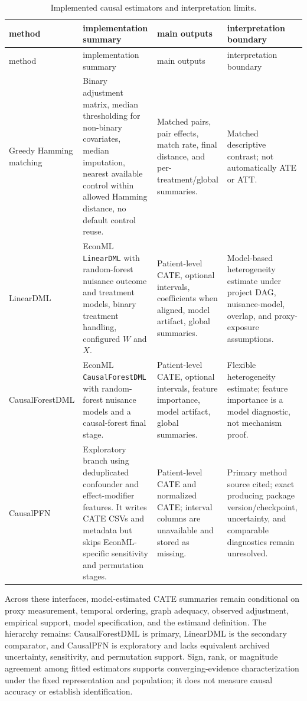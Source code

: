 \begin{longtable}{@{}L{0.18\textwidth}L{0.24\textwidth}L{0.24\textwidth}L{0.24\textwidth}@{}}
\caption[Implemented causal estimators and interpretation limits.]{Implemented causal estimators and interpretation limits.}
\label{tab:causal-estimator-methods}\\
\toprule
method & implementation summary & main outputs & interpretation boundary \\
\midrule
\endfirsthead
\toprule
method & implementation summary & main outputs & interpretation boundary \\
\midrule
\endhead
Greedy Hamming matching & Binary adjustment matrix, median thresholding for non-binary covariates, median imputation, nearest available control within allowed Hamming distance, no default control reuse. & Matched pairs, pair effects, match rate, final distance, and per-treatment/global summaries. & Matched descriptive contrast; not automatically ATE or ATT. \\
LinearDML & EconML \texttt{LinearDML} with random-forest nuisance outcome and treatment models, binary treatment handling, configured \(W\) and \(X\). & Patient-level CATE, optional intervals, coefficients when aligned, model artifact, global summaries. & Model-based heterogeneity estimate under project DAG, nuisance-model, overlap, and proxy-exposure assumptions. \\
CausalForest\allowbreak DML & EconML \texttt{CausalForestDML} with random-forest nuisance models and a causal-forest final stage. & Patient-level CATE, optional intervals, feature importance, model artifact, global summaries. & Flexible heterogeneity estimate; feature importance is a model diagnostic, not mechanism proof. \\
CausalPFN & Exploratory branch using deduplicated confounder and effect-modifier features.  It writes CATE CSVs and metadata but skips EconML-specific sensitivity and permutation stages. & Patient-level CATE and normalized CATE; interval columns are unavailable and stored as missing. & Primary method source cited; exact producing package version/checkpoint, uncertainty, and comparable diagnostics remain unresolved. \\
\bottomrule
\end{longtable}

Across these interfaces, model-estimated CATE summaries remain conditional on proxy measurement, temporal ordering, graph adequacy, observed adjustment, empirical support, model specification, and the estimand definition.  The hierarchy remains: CausalForestDML is primary, LinearDML is the secondary comparator, and CausalPFN is exploratory and lacks equivalent archived uncertainty, sensitivity, and permutation support.  Sign, rank, or magnitude agreement among fitted estimators supports converging-evidence characterization under the fixed representation and population; it does not measure causal accuracy or establish identification.

